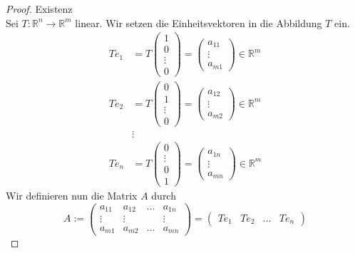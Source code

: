 \begin{proof}
    Existenz\\
    Sei $T:\mathbb{R}^n\to \mathbb{R}^m$ linear. Wir setzen die Einheitsvektoren in die Abbildung $T$ ein.
    \begin{align*}
        Te_1 &= T \begin{pmatrix}
            1\\0\\\vdots\\0
        \end{pmatrix}=\begin{pmatrix}
            a_{11}\\\vdots\\ a_{m1}
        \end{pmatrix}\in\mathbb{R}^m\\
        Te_2 &= T \begin{pmatrix}
            0\\1\\\vdots\\0
        \end{pmatrix}=\begin{pmatrix}
            a_{12}\\\vdots\\ a_{m2}
        \end{pmatrix}\in\mathbb{R}^m\\
        &\vdots\\
        Te_n &= T \begin{pmatrix}
            0\\\vdots\\0\\1
        \end{pmatrix}=\begin{pmatrix}
            a_{1n}\\\vdots\\ a_{mn}
        \end{pmatrix}\in\mathbb{R}^m
    \end{align*}
    Wir definieren nun die Matrix $A$ durch
    \[
        A := \begin{pmatrix}
            a_{11} & a_{12} & \dots & a_{1n}\\
            \vdots & \vdots& &\vdots\\
            a_{m1} & a_{m2} & \dots & a_{mn}
        \end{pmatrix} = \begin{pmatrix}
            Te_1 & Te_2 & \dots & Te_n
        \end{pmatrix}
\]
\end{proof}
